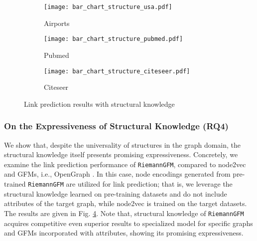 \begin{figure}[t]
    \centering 
    \begin{subfigure}{0.3\linewidth}
        \centering
        \texttt{[image: bar\_chart\_structure\_usa.pdf]}
        \caption{Airports}
        \label{fig:chart1}
    \end{subfigure}
    \begin{subfigure}{0.3\linewidth}
        \centering
        \texttt{[image: bar\_chart\_structure\_pubmed.pdf]}
        \caption{Pubmed}
        \label{fig:chart2}
    \end{subfigure}
    \begin{subfigure}{0.3\linewidth}
        \centering
        \texttt{[image: bar\_chart\_structure\_citeseer.pdf]}
        \caption{Citeseer}
        \label{fig:chart3}
    \end{subfigure}
           \vspace{-0.15in}
    \caption{Link prediction results with structural knowledge}
    \label{fig:structure-only}
           \vspace{-0.15in}
\end{figure}
  \vspace{-0.05in}
\subsubsection{\textbf{On the Expressiveness of Structural Knowledge (RQ4)}}
We show that, despite the universality of structures in the graph domain, the structural knowledge itself presents promising expressiveness. 
Concretely, we examine the link prediction performance of \texttt{RiemannGFM}, compared to node2vec \cite{kdd16node2vec} 
and GFMs, i.e., OpenGraph \cite{xia2024opengraph}.
In this case, node encodings generated from pre-trained \texttt{RiemannGFM} are utilized for link prediction; that is, we leverage the structural knowledge learned on pre-training datasets and do not include attributes of the target graph, while node2vec is trained on the target datasets.
The results are given in Fig. \ref{fig:structure-only}.
Note that, structural knowledge of \texttt{RiemannGFM} acquires competitive even superior results to specialized model for specific graphs and GFMs incorporated with attributes, showing its promising expressiveness.


